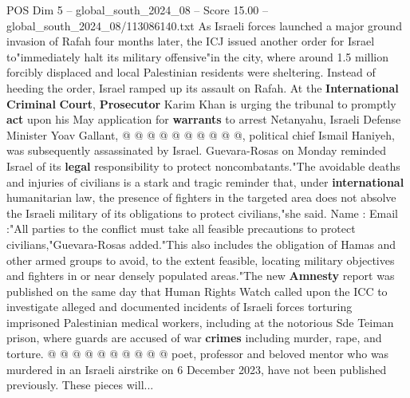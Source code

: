 \begin{textsample}{POS Dim 5 – global\_south\_2024\_08 – Score 15.00 – global\_south\_2024\_08/113086140.txt}
As Israeli forces launched a major ground invasion of Rafah four months later, the ICJ issued another order for Israel to"immediately halt its military offensive"in the city, where around 1.5 million forcibly displaced and local Palestinian residents were sheltering.
Instead of heeding the order, Israel ramped up its assault on Rafah.
At the \textbf{International} \textbf{Criminal} \textbf{Court}, \textbf{Prosecutor} Karim Khan is urging the tribunal to promptly \textbf{act} upon his May application for \textbf{warrants} to arrest Netanyahu, Israeli Defense Minister Yoav Gallant, @ @ @ @ @ @ @ @ @ @, political chief Ismail Haniyeh, was subsequently assassinated by Israel.
Guevara-Rosas on Monday reminded Israel of its \textbf{legal} responsibility to protect noncombatants."The avoidable deaths and injuries of civilians is a stark and tragic reminder that, under \textbf{international} humanitarian law, the presence of fighters in the targeted area does not absolve the Israeli military of its obligations to protect civilians,"she said.
Name : Email :"All parties to the conflict must take all feasible precautions to protect civilians,"Guevara-Rosas added."This also includes the obligation of Hamas and other armed groups to avoid, to the extent feasible, locating military objectives and fighters in or near densely populated areas."The new \textbf{Amnesty} report was published on the same day that Human Rights Watch called upon the ICC to investigate alleged and documented incidents of Israeli forces torturing imprisoned Palestinian medical workers, including at the notorious Sde Teiman prison, where guards are accused of war \textbf{crimes} including murder, rape, and torture. @ @ @ @ @ @ @ @ @ @ poet, professor and beloved mentor who was murdered in an Israeli airstrike on 6 December 2023, have not been published previously.
These pieces will...

\end{textsample}
